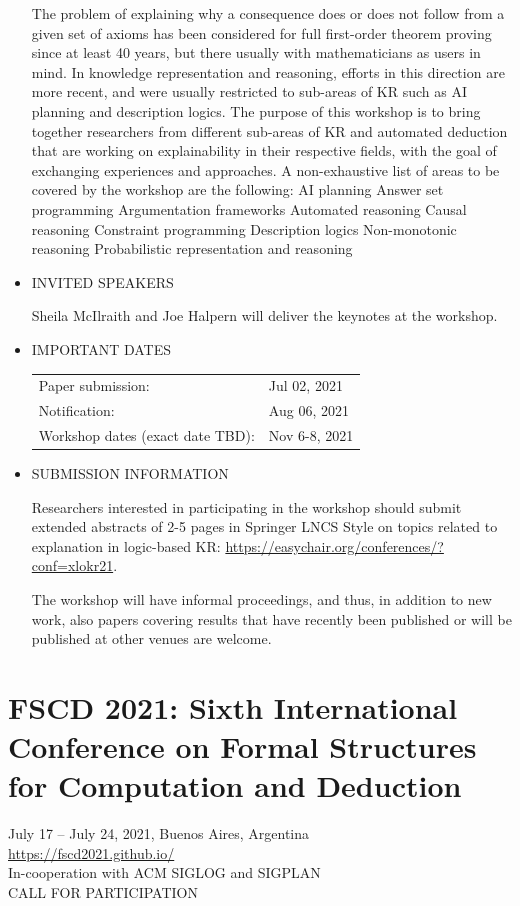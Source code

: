 \documentclass[prodmode,acmtecs]{acmsmall} %
\begin{document}
\begin{itemize}
  The problem of explaining why a consequence does or does not follow from a given set of axioms has been considered for full first-order theorem proving since at least 40 years, but there usually with mathematicians as users in mind. In knowledge representation and reasoning, efforts in this direction are more recent, and were usually restricted to sub-areas of KR such as AI planning and description logics. The purpose of this workshop is to bring together researchers from different sub-areas of KR and automated deduction that are working on explainability in their respective fields, with the goal of exchanging experiences and approaches. A non-exhaustive list of areas to be covered by the workshop are the following: AI planning Answer set programming Argumentation frameworks Automated reasoning Causal reasoning Constraint programming Description logics Non-monotonic reasoning Probabilistic representation and reasoning  
 
\item  INVITED SPEAKERS 
 
  Sheila McIlraith and Joe Halpern will deliver the keynotes at the workshop.  
 
\item  IMPORTANT DATES   
 
\begin{tabulary}{\linewidth}{LL}Paper submission:  & Jul 02, 2021 \\
Notification:  & Aug 06, 2021 \\
Workshop dates (exact date TBD):  & Nov 6-8, 2021 \\
\end{tabulary}
 
\item   SUBMISSION INFORMATION 
 
  Researchers interested in participating in the workshop should submit extended abstracts of 2-5 pages in Springer LNCS Style on topics related to explanation in logic-based KR: \href{https://easychair.org/conferences/?conf=xlokr21}{https://easychair.org/conferences/?conf=xlokr21}.  
 
  The workshop will have informal proceedings, and thus, in addition to new work, also papers covering results that have recently been published or will be published at other venues are welcome.  
 
\end{itemize}\section{FSCD 2021: Sixth International Conference on Formal Structures for Computation and Deduction}\label{FSCD2021}  July 17 – July 24, 2021, Buenos Aires, Argentina\\ 
  \href{https://fscd2021.github.io/}{https://fscd2021.github.io/}\\ 
  In-cooperation with ACM SIGLOG and SIGPLAN\\ 
CALL FOR PARTICIPATION 
\end{document}
